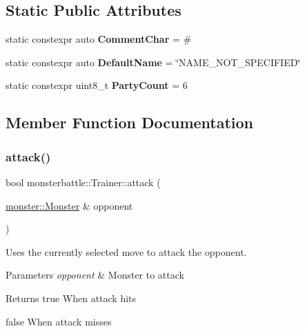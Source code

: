 \subsection*{Static Public Attributes}
\begin{DoxyCompactItemize}
\item 
\mbox{\label{classmonsterbattle_1_1Trainer_a810c3f0628d704164be871a100bb3a50}} 
static constexpr auto {\bfseries Comment\+Char} = \textquotesingle{}\#\textquotesingle{}
\item 
\mbox{\label{classmonsterbattle_1_1Trainer_a2a81578b483a40508d84bc9cc744a89e}} 
static constexpr auto {\bfseries Default\+Name} = \char`\"{}N\+A\+M\+E\+\_\+\+N\+O\+T\+\_\+\+S\+P\+E\+C\+I\+F\+I\+ED\char`\"{}
\item 
\mbox{\label{classmonsterbattle_1_1Trainer_a76f5fb4aa7023d28b5b8ec4ff1dd358a}} 
static constexpr uint8\+\_\+t {\bfseries Party\+Count} = 6
\end{DoxyCompactItemize}


\subsection{Member Function Documentation}
\mbox{\label{classmonsterbattle_1_1Trainer_ac15af2a463e8241ac432f81b1b64e015}} 
\subsubsection{\texorpdfstring{attack()}{attack()}}
{\footnotesize\ttfamily bool monsterbattle\+::\+Trainer\+::attack (\begin{DoxyParamCaption}\item[{\hyperlink{classmonsterbattle_1_1monster_1_1Monster}{monster\+::\+Monster} \&}]{opponent }\end{DoxyParamCaption})}



Uses the currently selected move to attack the opponent. 


\begin{DoxyParams}{Parameters}
{\em opponent} & Monster to attack \\
\hline
\end{DoxyParams}
\begin{DoxyReturn}{Returns}
true When attack hits 

false When attack misses
\end{DoxyReturn}

